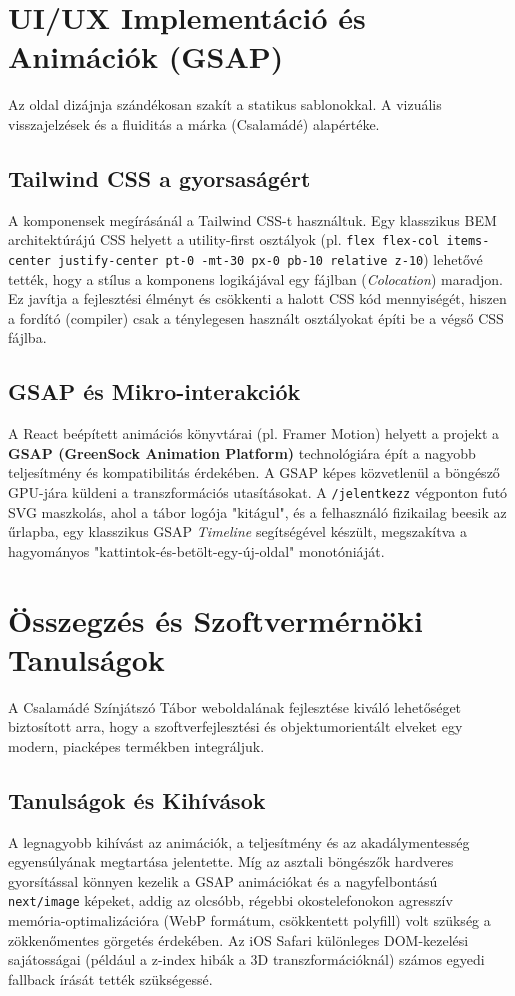 \documentclass[12pt, a4paper]{report}
\begin{document}
\chapter{UI/UX Implementáció és Animációk (GSAP)}

Az oldal dizájnja szándékosan szakít a statikus sablonokkal. A vizuális visszajelzések és a fluiditás a márka (Csalamádé) alapértéke.

\section{Tailwind CSS a gyorsaságért}
A komponensek megírásánál a Tailwind CSS-t használtuk. Egy klasszikus BEM architektúrájú CSS helyett a utility-first osztályok (pl. \texttt{flex flex-col items-center justify-center pt-0 -mt-30 px-0 pb-10 relative z-10}) lehetővé tették, hogy a stílus a komponens logikájával egy fájlban (\textit{Colocation}) maradjon. Ez javítja a fejlesztési élményt és csökkenti a halott CSS kód mennyiségét, hiszen a fordító (compiler) csak a ténylegesen használt osztályokat építi be a végső CSS fájlba.

\section{GSAP és Mikro-interakciók}
A React beépített animációs könyvtárai (pl. Framer Motion) helyett a projekt a \textbf{GSAP (GreenSock Animation Platform)} technológiára épít a nagyobb teljesítmény és kompatibilitás érdekében. A GSAP képes közvetlenül a böngésző GPU-jára küldeni a transzformációs utasításokat. A \texttt{/jelentkezz} végponton futó SVG maszkolás, ahol a tábor logója "kitágul", és a felhasználó fizikailag beesik az űrlapba, egy klasszikus GSAP \textit{Timeline} segítségével készült, megszakítva a hagyományos "kattintok-és-betölt-egy-új-oldal" monotóniáját.

\chapter{Összegzés és Szoftvermérnöki Tanulságok}

A Csalamádé Színjátszó Tábor weboldalának fejlesztése kiváló lehetőséget biztosított arra, hogy a szoftverfejlesztési és objektumorientált elveket egy modern, piacképes termékben integráljuk.

\section{Tanulságok és Kihívások}
A legnagyobb kihívást az animációk, a teljesítmény és az akadálymentesség egyensúlyának megtartása jelentette. Míg az asztali böngészők hardveres gyorsítással könnyen kezelik a GSAP animációkat és a nagyfelbontású \texttt{next/image} képeket, addig az olcsóbb, régebbi okostelefonokon agresszív memória-optimalizációra (WebP formátum, csökkentett polyfill) volt szükség a zökkenőmentes görgetés érdekében. Az iOS Safari különleges DOM-kezelési sajátosságai (például a z-index hibák a 3D transzformációknál) számos egyedi fallback írását tették szükségessé.
\end{document}
